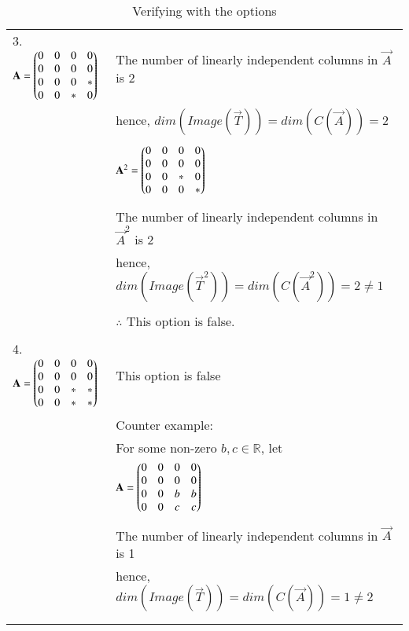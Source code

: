 \begin{longtable}{|l|l|}
        3. $\mathbf{A} = \begin{pmatrix}0 & 0 & 0 & 0 \\ 0 & 0 & 0 & 0 \\ 0 & 0 & 0 & * \\ 0 & 0 & * & 0\end{pmatrix}$ & The number of linearly independent columns in $\vec{A}$ is 2\\
        & hence, $dim(Image(\vec{T})) = dim(C(\vec{A})) = 2$\\
        & \\
        & $\mathbf{A}^2 = \begin{pmatrix}0 & 0 & 0 & 0 \\ 0 & 0 & 0 & 0 \\ 0 & 0 & * & 0 \\ 0 & 0 & 0 & *\end{pmatrix}$\\
        & \\
        & The number of linearly independent columns in $\vec{A}^2$ is 2\\
        & hence, $dim(Image(\vec{T}^2)) = dim(C(\vec{A}^2)) = 2 \neq 1$\\
        & \\
        & $\therefore$ This option is false.\\
    \hline
        & \\
        4. $\mathbf{A} = \begin{pmatrix}0 & 0 & 0 & 0 \\ 0 & 0 & 0 & 0 \\ 0 & 0 & * & * \\ 0 & 0 & * & *\end{pmatrix}$ & This option is false\\
        & Counter example:\\
        & For some non-zero $b,c \in \mathbb R$, let\\
        & $\mathbf{A} = \begin{pmatrix}0 & 0 & 0 & 0 \\ 0 & 0 & 0 & 0 \\ 0 & 0 & b & b \\ 0 & 0 & c & c\end{pmatrix}$\\
        & \\
        & The number of linearly independent columns in $\vec{A}$ is 1\\
        & hence, $dim(Image(\vec{T})) = dim(C(\vec{A})) = 1 \neq 2$\\
        & \\
    \hline
    \caption{Verifying with the options}
    \label{eq:solutions/2015/june/31/tab:proof}
\end{longtable}
\twocolumn
